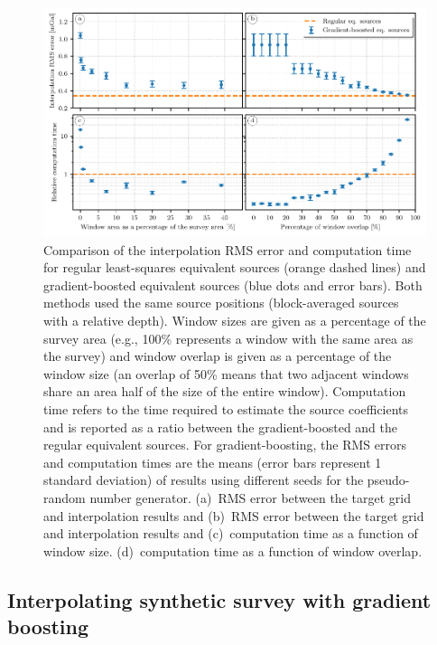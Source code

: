 \begin{figure}
    \includegraphics[width=\linewidth]{figs/gradient-boosted-comparisons.pdf}
    \caption{
        Comparison of the interpolation RMS error and computation time for
        regular least-squares equivalent sources (orange dashed lines) and
        gradient-boosted equivalent sources (blue dots and error bars).
        Both methods used the same source positions (block-averaged sources
        with a relative depth).
        Window sizes are given as a percentage of the survey area (e.g., 100\%
        represents a window with the same area as the survey) and window
        overlap is given as a percentage of the window size
        (an overlap of 50\% means that two adjacent windows
        share an area half of the size of the entire window).
        Computation time refers to the time required to estimate the source
        coefficients and is reported as a ratio between the gradient-boosted
        and the regular equivalent sources.
        For gradient-boosting, the RMS errors and computation times are the
        means (error bars represent 1 standard deviation) of results using
        different seeds for the pseudo-random number generator.
        (a)~RMS error between the target grid and interpolation results and
        (b)~RMS error between the target grid and interpolation results and
        (c)~computation time as a function of window size.
        (d)~computation time as a function of window overlap.
}
    \label{fig:gradient-boosted-comparison}
\end{figure}


\subsection{
    Interpolating synthetic survey with gradient boosting
}


